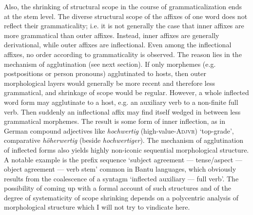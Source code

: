 Also, the shrinking of structural scope in the course of grammaticalization ends at the stem level. The diverse structural scope of the affixes of one word does not reflect their grammaticality; i.e. it is not generally the case that inner affixes are more grammatical than outer affixes. Instead, inner affixes are generally derivational, while outer affixes are inflectional. Even among the inflectional affixes, no order according to grammaticality is observed. The reason lies in the mechanism of agglutination (see next section). If only morphemes (e.g. postpositions or person pronouns) agglutinated to hosts, then outer morphological layers would generally be more recent and therefore less grammatical, and shrinkage of scope would be regular. However, a whole inflected word form may agglutinate to a host, e.g. an auxiliary verb to a non-finite full verb. Then suddenly an inflectional affix may find itself wedged in between less grammatical morphemes. The result is some form of inner inflection, as in German compound adjectives like \textit{hochwertig} (high-value-\textsc{Adjvr}) ‘top-grade’, comparative \textit{höherwertig} (beside \textit{hochwertiger}). The mechanism of agglutination of inflected forms also yields highly non-iconic sequential morphological structure. A notable example is the prefix sequence ‘subject agreement — tense/aspect — object agreement — verb stem’ common in Bantu languages, which obviously results from the coalescence of a syntagm ‘inflected auxiliary — full verb’. The possibility of coming up with a formal account of such structures and of the degree of systematicity of scope shrinking depends on a polycentric analysis of morphological structure which I will not try to vindicate here.

